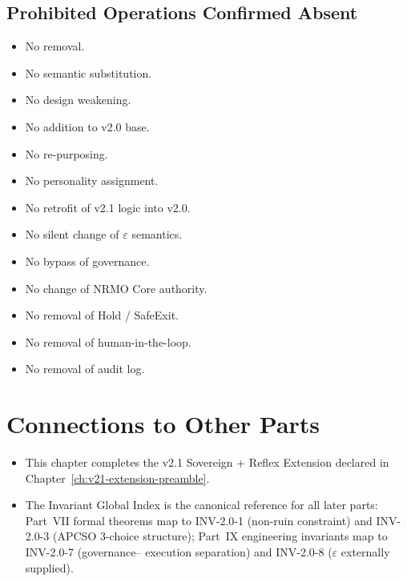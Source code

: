 \subsection{Prohibited Operations Confirmed Absent}

\begin{itemize}
\item[$\checkmark$] No removal.
\item[$\checkmark$] No semantic substitution.
\item[$\checkmark$] No design weakening.
\item[$\checkmark$] No addition to v2.0 base.
\item[$\checkmark$] No re-purposing.
\item[$\checkmark$] No personality assignment.
\item[$\checkmark$] No retrofit of v2.1 logic into v2.0.
\item[$\checkmark$] No silent change of $\varepsilon$ semantics.
\item[$\checkmark$] No bypass of governance.
\item[$\checkmark$] No change of NRMO Core authority.
\item[$\checkmark$] No removal of Hold / SafeExit.
\item[$\checkmark$] No removal of human-in-the-loop.
\item[$\checkmark$] No removal of audit log.
\end{itemize}


\section*{Connections to Other Parts}

\begin{itemize}
\item This chapter completes the v2.1 Sovereign + Reflex Extension
declared in Chapter~\ref{ch:v21-extension-preamble}.
\item The Invariant Global Index is the canonical reference for all
later parts: Part~VII formal theorems map to INV-2.0-1
(non-ruin constraint) and INV-2.0-3 (APCSO 3-choice structure);
Part~IX engineering invariants map to INV-2.0-7 (governance--
execution separation) and INV-2.0-8 ($\varepsilon$ externally
supplied).
\end{itemize}
